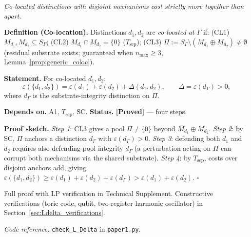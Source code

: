 \documentclass[11pt]{article}
\theoremstyle{remark}
\newcommand{\coderef}[2]{\smallskip\noindent\textit{Code reference:} \texttt{#1} in \texttt{#2}.}
\begin{document}
\begin{tcolorbox}[apfbox, title={$L_{\Delta}$ (Competition): Superadditivity from Substrate Integrity}]
\textit{Co-located distinctions with disjoint mechanisms cost strictly more together than apart.}

\smallskip\noindent\textbf{Definition (Co-location).}  Distinctions $d_1, d_2$ are \emph{co-located at $\Gamma$} if: (CL1) $M_{d_1}, M_{d_2} \subseteq S_\Gamma$; (CL2) $M_{d_1} \cap M_{d_2} = \{0\}$ ($T_{\mathrm{sep}}$); (CL3) $\Pi := S_\Gamma \setminus (M_{d_1} \oplus M_{d_2}) \ne \emptyset$ (residual substrate exists; guaranteed when $n_{\max} \ge 3$, Lemma~\ref{prop:generic_coloc}).\label{prop:generic_coloc}

\smallskip\noindent\textbf{Statement.}  For co-located $d_1, d_2$:
\begin{equation}\label{eq:Ldelta}
\varepsilon(\{d_1, d_2\}) = \varepsilon(d_1) + \varepsilon(d_2) + \Delta(d_1,d_2), \qquad \Delta = \varepsilon(d_\Gamma) > 0,
\end{equation}
where $d_\Gamma$ is the substrate-integrity distinction on $\Pi$.

\smallskip\noindent\textbf{Depends on.}  A1, $T_{\mathrm{sep}}$, SC.  \textbf{Status.}  \textbf{[Proved]} --- four steps.

\smallskip\noindent\textbf{Proof sketch.}  \textit{Step 1}: CL3 gives a pool $\Pi \ne \{0\}$ beyond $M_{d_1} \oplus M_{d_2}$. \textit{Step 2}: by SC, $\Pi$ anchors a distinction $d_\Gamma$ with $\varepsilon(d_\Gamma) > 0$.  \textit{Step 3}: defending both $d_1$ and $d_2$ requires also defending pool integrity $d_\Gamma$ (a perturbation acting on $\Pi$ can corrupt both mechanisms via the shared substrate).  \textit{Step 4}: by $T_{\mathrm{sep}}$, costs over disjoint anchors add, giving $\varepsilon(\{d_1,d_2\}) \ge \varepsilon(d_1) + \varepsilon(d_2) + \varepsilon(d_\Gamma) > \varepsilon(d_1) + \varepsilon(d_2)$.  \hfill$\square$

\smallskip\noindent Full proof with LP verification in Technical Supplement.  Constructive verifications (toric code, qubit, two-register harmonic oscillator) in Section~\ref{sec:Ldelta_verifications}.

\coderef{check\_L\_Delta}{paper1.py}
\end{tcolorbox}
\end{document}
